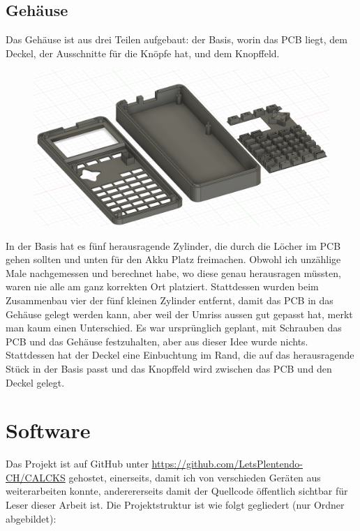 \documentclass[12pt, a4paper]{report}
\begin{document}
\subsection{Gehäuse}
Das Gehäuse ist aus drei Teilen aufgebaut: der Basis, worin das PCB liegt, dem Deckel, der Ausschnitte für die Knöpfe hat, und dem Knopffeld.
\newpage
\begin{figure}[H]
\includegraphics[width=\linewidth]{assets/3dcomponents.jpg}
\end{figure}
In der Basis hat es fünf herausragende Zylinder, die durch die Löcher im PCB gehen sollten und unten für den Akku Platz freimachen. Obwohl ich unzählige Male nachgemessen und berechnet habe, wo diese genau herausragen müssten, waren nie alle am ganz korrekten Ort platziert. Stattdessen wurden beim Zusammenbau vier der fünf kleinen Zylinder entfernt, damit das PCB in das Gehäuse gelegt werden kann, aber weil der Umriss aussen gut gepasst hat, merkt man kaum einen Unterschied. Es war ursprünglich geplant, mit Schrauben das PCB und das Gehäuse festzuhalten, aber aus dieser Idee wurde nichts. Stattdessen hat der Deckel eine Einbuchtung im Rand, die auf das herausragende Stück in der Basis passt und das Knopffeld wird zwischen das PCB und den Deckel gelegt.
\section{Software}
Das Projekt ist auf GitHub unter \url{https://github.com/LetsPlentendo-CH/CALCKS} gehostet, einerseits, damit ich von verschieden Geräten aus weiterarbeiten konnte, anderererseits damit der Quellcode öffentlich sichtbar für Leser dieser Arbeit ist.
Die Projektstruktur ist wie folgt gegliedert (nur Ordner abgebildet):
\end{document}
